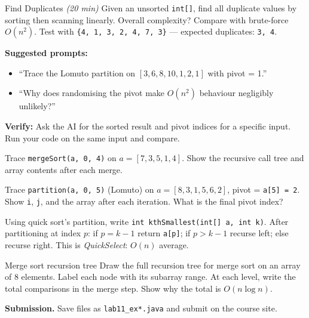 \documentclass[11pt]{article}
\begin{document}
\begin{labexercise}{Find Duplicates \hfill {\small \itshape (20 min)}}
Given an unsorted \texttt{int[]}, find all duplicate values by sorting then scanning linearly.
Overall complexity? Compare with brute-force $O(n^2)$.
Test with \texttt{\{4, 1, 3, 2, 4, 7, 3\}} --- expected duplicates: \texttt{3, 4}.
\end{labexercise}

\begin{aicollab}
\textbf{Suggested prompts:}
\begin{itemize}[leftmargin=*,nosep]
  \item ``Trace the Lomuto partition on $[3,6,8,10,1,2,1]$ with pivot = 1.''
  \item ``Why does randomising the pivot make $O(n^2)$ behaviour negligibly unlikely?''
\end{itemize}
\medskip\textbf{Verify:} Ask the AI for the sorted result and pivot indices for a specific input.
Run your code on the same input and compare.
\end{aicollab}

\takehomebanner

\begin{trace}
Trace \texttt{mergeSort(a, 0, 4)} on $a = [7, 3, 5, 1, 4]$.
Show the recursive call tree and array contents after each merge.
\end{trace}

\begin{trace}
Trace \texttt{partition(a, 0, 5)} (Lomuto) on $a = [8, 3, 1, 5, 6, 2]$, pivot = \texttt{a[5] = 2}.
Show \texttt{i}, \texttt{j}, and the array after each iteration.
What is the final pivot index?
\end{trace}

\begin{writecode}
Using quick sort's partition, write \texttt{int kthSmallest(int[] a, int k)}.
After partitioning at index $p$: if $p = k-1$ return \texttt{a[p]};
if $p > k-1$ recurse left; else recurse right.
This is \emph{QuickSelect}: $O(n)$ average.
\end{writecode}

\begin{drawex}{Merge sort recursion tree}
Draw the full recursion tree for merge sort on an array of 8 elements.
Label each node with its subarray range.
At each level, write the total comparisons in the merge step.
Show why the total is $O(n \log n)$.
\end{drawex}

\vspace{4pt}
\noindent\textbf{Submission.} Save files as \texttt{lab11\_ex*.java} and submit on the course site.
\end{document}
